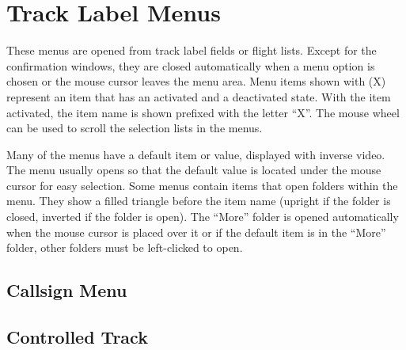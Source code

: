 \documentclass[a4paper,oneside,11pt]{memoir}
\begin{document}
\section{Track Label Menus}

These menus are opened from track label fields or flight lists. Except for the confirmation windows, they are closed automatically when a menu option is chosen or the mouse cursor leaves the menu area. Menu items shown with (X) represent an item that has an activated and a deactivated state. With the item activated, the item name is shown prefixed with the letter “X”. The mouse wheel can be used to scroll the selection lists in the menus.

\bigskip

Many of the menus have a default item or value, displayed with inverse video. The menu usually opens so that the default value is located under the mouse cursor for easy selection. Some menus contain items that open folders within the menu. They show a filled triangle before the item name (upright if the folder is closed, inverted if the folder is open). The “More” folder is opened automatically when the mouse cursor is placed over it or if the default item is in the “More” folder, other folders must be left-clicked to open.

\subsection{Callsign Menu}
\label{menu:cs}

\subsection*{Controlled Track}

\end{document}
